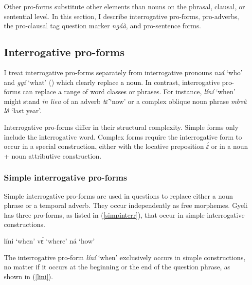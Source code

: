 Other pro-forms substitute other elements than nouns on the phrasal, clausal, or sentential level. In this section, I describe interrogative pro-forms, pro-adverbs, the pro-clausal tag question marker {\itshape ngáà}, and pro-sentence forms.



\subsection{Interrogative pro-forms}
\label{sec:INTERR}

I treat interrogative pro-forms separately from interrogative pronouns {\itshape nzá} `who' and {\itshape gyí} `what' () which clearly replace a noun. In contrast, interrogative pro-forms can replace a range of word classes or phrases. For instance, {\itshape líní} `when' might stand {\itshape in lieu} of an adverb {\itshape tɛ̂} `now' or a complex oblique noun phrase {\itshape mbvû lã̂} `last year'. 

Interrogative pro-forms differ in their structural complexity. Simple forms only include the interrogative word. Complex forms require the interrogative form to occur in a special construction, either with the locative preposition {\itshape ɛ́} or in a noun + noun attributive construction.




\subsubsection{Simple interrogative pro-forms}
\label{sec:INTERRS}

Simple interrogative pro-forms are used in questions to replace either a noun phrase or a temporal adverb. They occur independently as free morphemes. Gyeli has three pro-forms, as listed in (\ref{simpinterr}),  that occur in simple interrogative constructions. 

\begin{exe}\ex\label{simpinterr}
\begin{xlist}
\ex líní `when'
\ex vɛ́ `where'
\ex ná `how'
\end{xlist}
\end{exe}

The interrogative pro-form {\itshape líní} `when' exclusively occurs in simple constructions, no matter if it occurs at the beginning or the end of the question phrase, as shown in (\ref{lini}).

